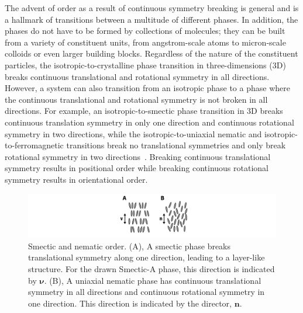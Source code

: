 The advent of order as a result of continuous symmetry breaking is general and is a hallmark of transitions between a multitude of different phases.
In addition, the phases do not have to be formed by collections of molecules; they can be built from a variety of constituent units, from angstrom-scale atoms to micron-scale colloids or even larger building blocks.
Regardless of the nature of the constituent particles, the isotropic-to-crystalline phase transition in three-dimensions (3D) breaks continuous translational and rotational symmetry in all directions.
However, a system can also transition from an isotropic phase to a phase where the continuous translational and rotational symmetry is not broken in all directions.
For example, an isotropic-to-smectic phase transition in 3D breaks continuous translation symmetry in only one direction and continuous rotational symmetry in two directions, while the isotropic-to-uniaxial nematic and isotropic-to-ferromagnetic transitions break no translational symmetries and only break rotational symmetry in two directions~\cite{RN175}.
Breaking continuous translational symmetry results in positional order while breaking continuous rotational symmetry results in orientational order.
\begin{figure}
  \includegraphics{figures/C1/Ch1-Figs_SmecticNematic.png}
  \caption{Smectic and nematic order.
  (A), A smectic phase breaks translational symmetry along one direction, leading to a layer-like structure.
  For the drawn Smectic-A phase, this direction is indicated by $\bm{\nu}$.
  (B), A uniaxial nematic phase has continuous translational symmetry in all directions and continuous rotational symmetry in one direction. This direction is indicated by the director, $\mathbf{n}$.}\label{f:1-SmecticNematic}
\end{figure}


